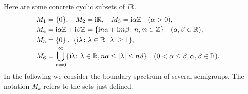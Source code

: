 	Here are some concrete cyclic subsets of\/ $\mathrm{i} \mathbb{R}$.
	\begin{align*}
		M_{1} &= \{0\}, \quad M_{2} = \im\R, \quad M_{3} = \im\alpha\Z \quad (\alpha > 0), \\
		M_{4} &= \im\alpha\Z + \im\beta\Z = \{\im n\alpha +  \im m\beta \colon n,m \in \Z\} \quad (\alpha, \beta \in \R), \\
		M_{5} &= \{0\} \cup \{\im \lambda \colon \lambda \in \R, |\lambda| \geq 1\}, \\
		M_{6} &= \bigcup_{n=0}^{\infty}\{\im \lambda \colon \lambda \in \R, n\alpha \leq |\lambda| \leq n\beta\} \quad (0 < \alpha \leq \beta, \alpha,\beta \in \R).
	\end{align*}
	In the following we consider the boundary spectrum of several semigroups. 
    The notation $M_{k}$ refers to the sets just defined.

